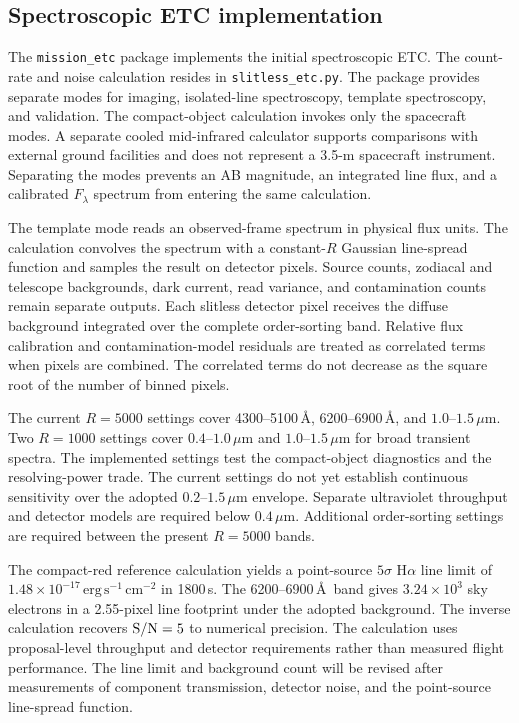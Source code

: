 \documentclass[10pt,onecolumn]{article}
\newcommand{\micron}{\,\mu\mathrm{m}}
\begin{document}
\subsection{Spectroscopic ETC implementation}

The \texttt{mission\_etc} package implements the initial spectroscopic ETC.
The count-rate and noise calculation resides in
\texttt{slitless\_etc.py}. The package provides separate modes for imaging,
isolated-line spectroscopy, template spectroscopy, and validation. The
compact-object calculation invokes only the spacecraft modes. A separate
cooled mid-infrared calculator supports comparisons with external ground
facilities and does not represent a 3.5-m spacecraft instrument. Separating
the modes prevents an AB magnitude, an integrated line flux, and a calibrated
$F_\lambda$ spectrum from entering the same calculation.

The template mode reads an observed-frame spectrum in physical flux units.
The calculation convolves the spectrum with a constant-$R$ Gaussian
line-spread function and samples the result on detector pixels. Source counts,
zodiacal and telescope backgrounds, dark current, read variance, and
contamination counts remain separate outputs. Each slitless detector pixel
receives the diffuse background integrated over the complete order-sorting
band. Relative flux calibration and contamination-model residuals are treated
as correlated terms when pixels are combined. The correlated terms do not
decrease as the square root of the number of binned pixels.

The current $R=5000$ settings cover 4300--5100\,\AA,
6200--6900\,\AA, and $1.0$--$1.5\micron$. Two $R=1000$ settings cover
$0.4$--$1.0\micron$ and $1.0$--$1.5\micron$ for broad transient spectra. The
implemented settings test the compact-object diagnostics and the
resolving-power trade. The current settings do not yet establish continuous
sensitivity over the adopted $0.2$--$1.5\micron$ envelope. Separate ultraviolet throughput and
detector models are required below $0.4\micron$. Additional order-sorting
settings are required between the present $R=5000$ bands.

The compact-red reference calculation yields a point-source
$5\sigma$ H$\alpha$ line limit of
$1.48\times10^{-17}\,\mathrm{erg\,s^{-1}\,cm^{-2}}$ in 1800\,s. The
6200--6900\,\AA\ band gives $3.24\times10^3$ sky electrons in a
2.55-pixel line footprint under the adopted background. The inverse
calculation recovers ${\rm S/N}=5$ to numerical precision. The calculation
uses proposal-level throughput and detector requirements rather than measured
flight performance. The line limit and background count will be revised after
measurements of component transmission, detector noise, and the point-source
line-spread function.
\end{document}
